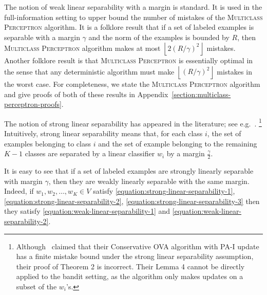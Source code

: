 The notion of weak linear separability with a margin is standard. It is used in the
full-information setting to upper bound the number of mistakes of the
\textsc{Multiclass Perceptron} algorithm. It is a
folklore result that if a set of labeled examples is separable with a margin
$\gamma$ and the norm of the examples is bounded by $R$, then \textsc{Multiclass
Perceptron} algorithm makes at most $\left\lfloor 2(R/\gamma)^2 \right \rfloor$
mistakes. Another folklore result is that \textsc{Multiclass Perceptron} is
essentially optimal in the sense that any deterministic algorithm must make
$\left\lfloor (R/\gamma)^2 \right \rfloor$ mistakes in the worst case. For
completeness, we state the \textsc{Multiclass Perceptron} algorithm
and give proofs of both of these results in
Appendix~\ref{section:multiclass-perceptron-proofs}.

The notion of strong linear separability has appeared in the literature;
see e.g.~\citet{Chen-Chen-Zhang-Chen-Zhang-2009}.
\footnote{Although~\cite{Chen-Chen-Zhang-Chen-Zhang-2009} claimed that their
Conservative OVA algorithm with PA-I update has a finite mistake bound under the strong
linear separability assumption, their proof of Theorem 2 is incorrect. Their
Lemma 4 cannot be directly applied to the bandit setting,
as the algorithm only makes updates on a subset of the $w_i$'s.}
Intuitively, strong linear
separability means that, for each class $i$, the set of examples belonging to class $i$ and
the set of example belonging to the remaining $K-1$ classes are separated by
a linear classifier $w_i$ by a margin $\frac \gamma 2$.


It is easy to see that if a set of labeled examples are strongly linearly
separable with margin $\gamma$, then they are weakly linearly separable with
the same margin. Indeed, if $w_1, w_2, \dots, w_K \in V$
satisfy \eqref{equation:strong-linear-separability-1},
\eqref{equation:strong-linear-separability-2},
\eqref{equation:strong-linear-separability-3} then they satisfy
\eqref{equation:weak-linear-separability-1} and
\eqref{equation:weak-linear-separability-2}.

